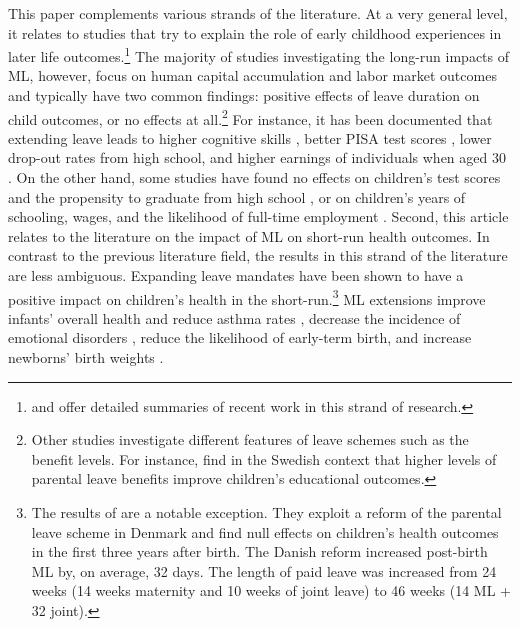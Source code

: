 This paper complements various strands of the literature. At a very general level, it relates to studies that try to explain the role of early childhood experiences in later life outcomes.\footnote{\cite{currie2011human} and \cite{almond2017childhood} offer detailed summaries of recent work in this strand of research.} The majority of studies investigating the long-run impacts of ML, however, focus on human capital accumulation and labor market outcomes and typically have two common findings: positive effects of leave duration on child outcomes, or no effects at all.\footnote{Other studies investigate different features of leave schemes such as the benefit levels. For instance, \cite{ginja2020parental} find in the Swedish context that higher levels of parental leave benefits improve children's educational outcomes.} For instance, it has been documented that extending leave leads to higher cognitive skills \citep{albagli2018}, better PISA test scores \citep{danzer2017}, lower drop-out rates from high school, and higher earnings of individuals when aged 30 \citep{carneiro2015flying}. On the other hand, some studies have found no effects on children's test scores and the propensity to graduate from high school \citep{Dahl2016Case}, or on children's years of schooling, wages, and the likelihood of full-time employment \citep{Dustmann2012}. Second, this article relates to the literature on the impact of ML on short-run health outcomes. In contrast to the previous literature field, the results in this strand of the literature are less ambiguous. Expanding leave mandates have been shown to have a positive impact on children's health in the short-run.\footnote{The results of \cite{beuchert2016} are a notable exception. They exploit a reform of the parental leave scheme in Denmark and find null effects on children's health outcomes in the first three years after birth. The Danish reform increased post-birth ML by, on average, 32 days. The length of paid leave was increased from 24 weeks (14 weeks maternity and 10 weeks of joint leave) to 46 weeks (14 ML + 32 joint).} ML extensions improve infants' overall health and reduce asthma rates \citep{bullinger2019effect}, decrease the incidence of emotional disorders \citep{sayour2019impact}, reduce the likelihood of early-term birth, and increase newborns' birth weights \citep{stearns2015effects}.




